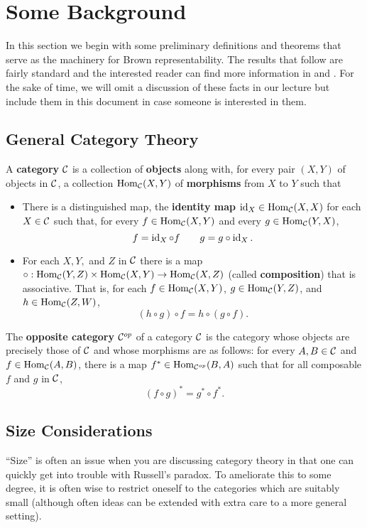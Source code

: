 \documentclass[12pt]{article}
\begin{document}
\section{Some Background}
In this section we begin with some preliminary definitions and theorems that serve as the machinery for Brown representability. 
The results that follow are fairly standard and the interested reader can find more information in \cite{neeman-book} and \cite{riehl16}.
For the sake of time, we will omit a discussion of these facts in our lecture but include them in this document in case someone is interested in them.
\subsection{General Category Theory}
\begin{defn}
  A \textbf{category} $\mathcal{C}$ is a collection of \textbf{objects} along with, for every pair $(X,Y)$ of objects in $\mathcal{C}$, a collection $\operatorname{Hom}_{\mathcal{C}}(X,Y)$ of \textbf{morphisms} from $X$ to $Y$ such that
  \begin{itemize}
    \item There is a distinguished map, the \textbf{identity map} $\operatorname{id}_X\in\operatorname{Hom}_{\mathcal{C}}(X,X)$ for each $X\in\mathcal{C}$ such that, for every $f\in\operatorname{Hom}_{\mathcal{C}}(X,Y)$ and every $g\in\operatorname{Hom}_{\mathcal{C}}(Y,X)$,
    \[f=\operatorname{id}_X\circ f\qquad g=g\circ\operatorname{id}_X.\]
    \item For each $X,Y,$ and $Z$ in $\mathcal{C}$ there is a map $\circ:\operatorname{Hom}_{\mathcal{C}}(Y,Z)\times\operatorname{Hom}_{\mathcal{C}}(X,Y)\to\operatorname{Hom}_{\mathcal{C}}(X,Z)$ (called \textbf{composition}) that is associative. That is, for each $f\in\operatorname{Hom}_{\mathcal{C}}(X,Y)$, $g\in\operatorname{Hom}_{\mathcal{C}}(Y,Z)$, and $h\in\operatorname{Hom}_{\mathcal{C}}(Z,W)$,
    \[(h\circ g)\circ f=h\circ(g\circ f).\]
  \end{itemize}
\end{defn}
\begin{defn}
	The \textbf{opposite category} $\mathcal{C}^{op}$ of a category $\mathcal{C}$ is the category whose objects are 
	precisely those of $\mathcal{C}$ and whose morphisms are as follows: for every $A,B\in\mathcal{C}$ and $f\in\operatorname{Hom}_{\mathcal{C}}(A,B)$,
	there is a map $f^\ast\in\operatorname{Hom}_{\mathcal{C}^{op}}(B,A)$ such that for all composable $f$ and $g$ in $\mathcal{C}$,
	\[(f\circ g)^\ast=g^\ast\circ f^\ast.\]
\end{defn}

\subsection{Size Considerations}
``Size'' is often an issue when you are discussing category theory in that one can quickly get into trouble with Russell's paradox.
To ameliorate this to some degree, it is often wise to restrict oneself to the categories which are suitably small (although often 
ideas can be extended with extra care to a more general setting).
\end{document}
